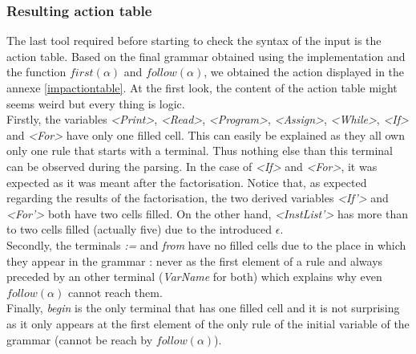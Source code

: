\documentclass[a4paper,11pt]{article}
\begin{document}
    \subsubsection{Resulting action table}
      The last tool required before starting to check the syntax of the input is the action table. Based on the final grammar obtained using the implementation and the function $first(\alpha)$ and $follow(\alpha)$, we obtained the action displayed in the annexe \ref{impactiontable}. At the first look, the content of the action table might seems weird but every thing is logic.\\
      Firstly, the variables \textit{<Print>}, \textit{<Read>}, \textit{<Program>}, \textit{<Assign>}, \textit{<While>}, \textit{<If>} and \textit{<For>} have only one filled cell. This can easily be explained as they all own only one rule that starts with a terminal. Thus nothing else than this terminal can be observed during the parsing. In the case of \textit{<If>} and \textit{<For>}, it was expected as it was meant after the factorisation. Notice that, as expected regarding the results of the factorisation, the two derived variables \textit{<If'>} and \textit{<For'>} both have two cells filled. On the other hand, \textit{<InstList'>} has more than to two cells filled (actually five) due to the introduced $\epsilon$.\\
      Secondly, the terminals \textit{:=} and \textit{from} have no filled cells due to the place in which they appear in the grammar : never as the first element of a rule and always preceded by an other terminal (\textit{VarName} for both) which explains why even $follow(\alpha)$ cannot reach them.\\
      Finally, \textit{begin} is the only terminal that has one filled cell and it is not surprising as it only appears at the first element of the only rule of the initial variable of the grammar (cannot be reach by $follow(\alpha)$).
    
\end{document}
